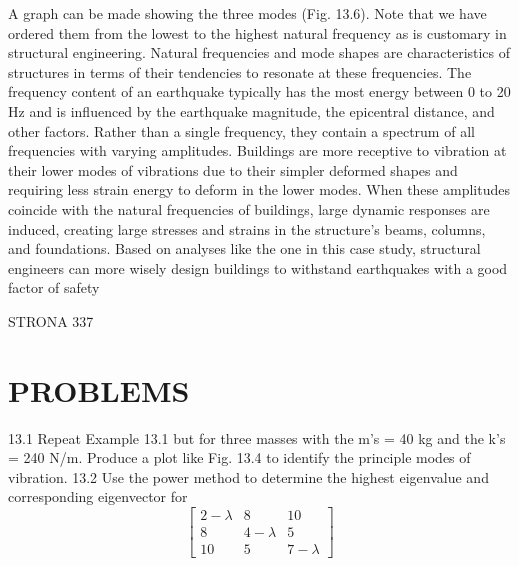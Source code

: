\documentclass[../main.tex]{subfiles}
\begin{document}
A graph can be made showing the three modes (Fig. 13.6). Note that we have ordered
them from the lowest to the highest natural frequency as is customary in structural
engineering.
Natural frequencies and mode shapes are characteristics of structures in terms of their
tendencies to resonate at these frequencies. The frequency content of an earthquake
typically has the most energy between 0 to 20 Hz and is influenced by the earthquake magnitude, the epicentral distance, and other factors. Rather than a single frequency, they
contain a spectrum of all frequencies with varying amplitudes. Buildings are more receptive
to vibration at their lower modes of vibrations due to their simpler deformed shapes and
requiring less strain energy to deform in the lower modes. When these amplitudes coincide
with the natural frequencies of buildings, large dynamic responses are induced, creating
large stresses and strains in the structure's beams, columns, and foundations. Based on
analyses like the one in this case study, structural engineers can more wisely design buildings to withstand earthquakes with a good factor of safety


STRONA 337
\section{PROBLEMS}
13.1 Repeat Example 13.1 but for three masses with the m's =
40 kg and the k's = 240 N/m. Produce a plot like Fig. 13.4 to
identify the principle modes of vibration.
13.2 Use the power method to determine the highest eigenvalue and corresponding eigenvector for
\begin{equation}
\begin{bmatrix}
2-\lambda  & 8 &10 \\
8 & 4-\lambda & 5\\
10 & 5 & 7-\lambda
\end{bmatrix}
\end{equation}
\end{document}
